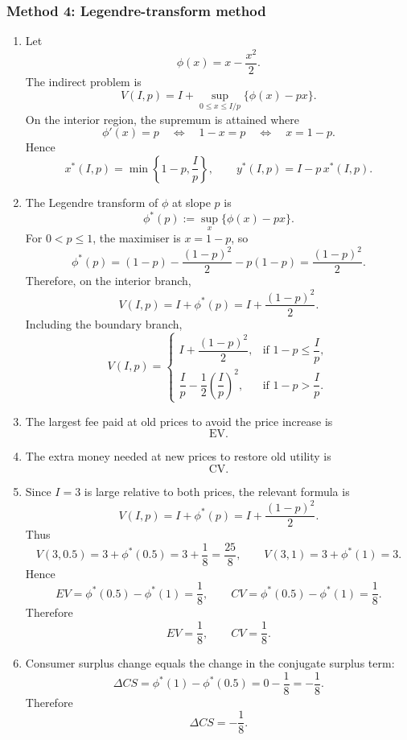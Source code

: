 \documentclass[12pt]{article}
\begin{document}
\subsubsection{Method 4: Legendre-transform method}
\begin{enumerate}[label=(\alph*)]
    \item
    Let
    \[
    \phi(x)=x-\frac{x^2}{2}.
    \]
    The indirect problem is
    \[
    V(I,p)
    =
    I+\sup_{0\le x\le I/p}\{\phi(x)-px\}.
    \]
    On the interior region, the supremum is attained where
    \[
    \phi'(x)=p
    \quad\Longleftrightarrow\quad
    1-x=p
    \quad\Longleftrightarrow\quad
    x=1-p.
    \]
    Hence
    \[
    \boxed{
    x^*(I,p)=\min\left\{1-p,\frac{I}{p}\right\},
    \qquad
    y^*(I,p)=I-p\,x^*(I,p).
    }
    \]

    \item
    The Legendre transform of \(\phi\) at slope \(p\) is
    \[
    \phi^*(p):=\sup_x\{\phi(x)-px\}.
    \]
    For \(0<p\le 1\), the maximiser is \(x=1-p\), so
    \[
    \phi^*(p)
    =
    \left(1-p\right)-\frac{(1-p)^2}{2}-p(1-p)
    =
    \frac{(1-p)^2}{2}.
    \]
    Therefore, on the interior branch,
    \[
    V(I,p)=I+\phi^*(p)=I+\frac{(1-p)^2}{2}.
    \]
    Including the boundary branch,
    \[
    \boxed{
    V(I,p)=
    \begin{cases}
    I+\dfrac{(1-p)^2}{2}, & \text{if } 1-p\le \dfrac{I}{p},\\[1.2ex]
    \dfrac{I}{p}-\dfrac12\left(\dfrac{I}{p}\right)^2, & \text{if } 1-p>\dfrac{I}{p}.
    \end{cases}}
    \]

    \item
    The largest fee paid at old prices to avoid the price increase is
    \[
    \boxed{\text{EV}.}
    \]

    \item
    The extra money needed at new prices to restore old utility is
    \[
    \boxed{\text{CV}.}
    \]

    \item
    Since \(I=3\) is large relative to both prices, the relevant formula is
    \[
    V(I,p)=I+\phi^*(p)=I+\frac{(1-p)^2}{2}.
    \]
    Thus
    \[
    V(3,0.5)=3+\phi^*(0.5)=3+\frac18=\frac{25}{8},
    \qquad
    V(3,1)=3+\phi^*(1)=3.
    \]
    Hence
    \[
    EV=\phi^*(0.5)-\phi^*(1)=\frac18,
    \qquad
    CV=\phi^*(0.5)-\phi^*(1)=\frac18.
    \]
    Therefore
    \[
    \boxed{EV=\frac18,\qquad CV=\frac18.}
    \]

    \item
    Consumer surplus change equals the change in the conjugate surplus term:
    \[
    \Delta CS
    =
    \phi^*(1)-\phi^*(0.5)
    =
    0-\frac18
    =
    -\frac18.
    \]
    Therefore
    \[
    \boxed{\Delta CS=-\frac18.}
    \]
\end{enumerate}
\end{document}
